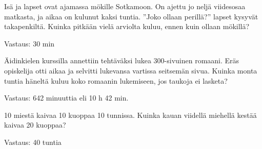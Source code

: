 \begin{tehtava}
    Isä ja lapset ovat ajamassa mökille Sotkamoon. On ajettu jo neljä
    viidesosaa matkasta, ja aikaa on kulunut kaksi tuntia. ''Joko ollaan perillä?''
    lapset kysyvät takapenkiltä. Kuinka pitkään vielä arviolta kuluu, ennen
    kuin ollaan mökillä?
    
    \begin{vastaus}
        Vastaus: 30 min
    \end{vastaus}
\end{tehtava}

\begin{tehtava}
    Äidinkielen kurssilla annettiin tehtäväksi lukea 300-sivuinen romaani.
    Eräs opiskelija otti aikaa ja selvitti lukevansa vartissa seitsemän sivua.
    Kuinka monta tuntia häneltä kuluu koko romaanin lukemiseen, jos
    taukoja ei lasketa?
    
    \begin{vastaus}
        Vastaus: 642 minuuttia eli 10 h 42 min.
    \end{vastaus}
\end{tehtava}

\begin{tehtava}
	10 miestä kaivaa 10 kuoppaa 10 tunnissa. 
	Kuinka kauan viidellä miehellä kestää kaivaa 20 kuoppaa?
	
	\begin{vastaus}
		Vastaus: 40 tuntia
	\end{vastaus}	
\end{tehtava}